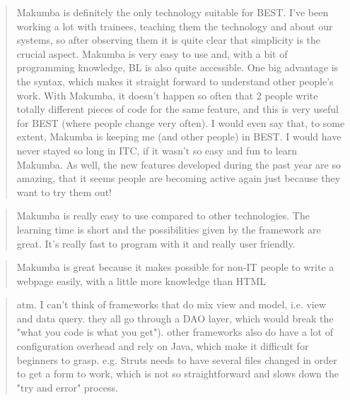 \documentclass{acm_proc_article-sp}
\begin{document}
\begin{quotation}
	Makumba is definitely the only technology suitable for BEST. I've been working a lot with trainees, teaching them the technology and about our systems, so after observing them it is quite clear that simplicity is the crucial aspect. Makumba is very easy to use and, with a bit of programming knowledge, BL is also quite accessible. One big advantage is the syntax, which makes it straight forward to understand other people's work. With Makumba, it doesn't happen so often that 2 people write totally different pieces of code for the same feature, and this is very useful for BEST (where people change very often). I would even say that, to some extent, Makumba is keeping me (and other people) in BEST. I would have never stayed so long in ITC, if it wasn't so easy and fun to learn Makumba. As well, the new features developed during the past year are so amazing, that it seems people are becoming active again just because they want to try them out! 
\end{quotation}

\begin{quotation}
	Makumba is really easy to use compared to other technologies. The learning time is short and the possibilities given by the framework are great. It's really fast to program with it and really user friendly. 
\end{quotation}

\begin{quotation}
	Makumba is great because it makes possible for non-IT people to write a webpage easily, with a little more knowledge than HTML
\end{quotation}

\begin{quotation}
	atm. I can't think of frameworks that do mix view and model, i.e. view and data query. they all go through a DAO layer, which would break the "what you code is what you get"). other frameworks also do have a lot of configuration overhead and rely on Java, which make it difficult for beginners to grasp. e.g. Struts needs to have several files changed in order to get a form to work, which is not so straightforward and slows down the "try and error" process. 
\end{quotation}
\end{document}
